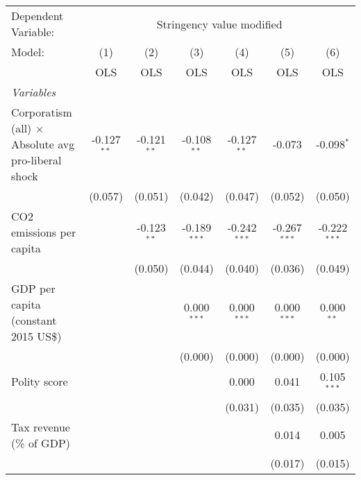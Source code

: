 
\begingroup
\centering
\begin{tabular}{lcccccc}
   \toprule
   Dependent Variable: & \multicolumn{6}{c}{Stringency value modified}\\
   Model:                                                     & (1)           & (2)           & (3)            & (4)            & (5)            & (6)\\  
                                                              &  OLS          & OLS           & OLS            & OLS            & OLS            & OLS\\  
   \midrule
   \emph{Variables}\\
   Corporatism (all) $\times$ Absolute avg pro-liberal shock  & -0.127$^{**}$ & -0.121$^{**}$ & -0.108$^{**}$  & -0.127$^{**}$  & -0.073         & -0.098$^{*}$\\   
                                                              & (0.057)       & (0.051)       & (0.042)        & (0.047)        & (0.052)        & (0.050)\\   
   CO2 emissions per capita                                   &               & -0.123$^{**}$ & -0.189$^{***}$ & -0.242$^{***}$ & -0.267$^{***}$ & -0.222$^{***}$\\   
                                                              &               & (0.050)       & (0.044)        & (0.040)        & (0.036)        & (0.049)\\   
   GDP per capita (constant 2015 US\$)                        &               &               & 0.000$^{***}$  & 0.000$^{***}$  & 0.000$^{***}$  & 0.000$^{**}$\\   
                                                              &               &               & (0.000)        & (0.000)        & (0.000)        & (0.000)\\   
   Polity score                                               &               &               &                & 0.000          & 0.041          & 0.105$^{***}$\\   
                                                              &               &               &                & (0.031)        & (0.035)        & (0.035)\\   
   Tax revenue (\% of GDP)                                    &               &               &                &                & 0.014          & 0.005\\   
                                                              &               &               &                &                & (0.017)        & (0.015)\\   

\end{tabular}
